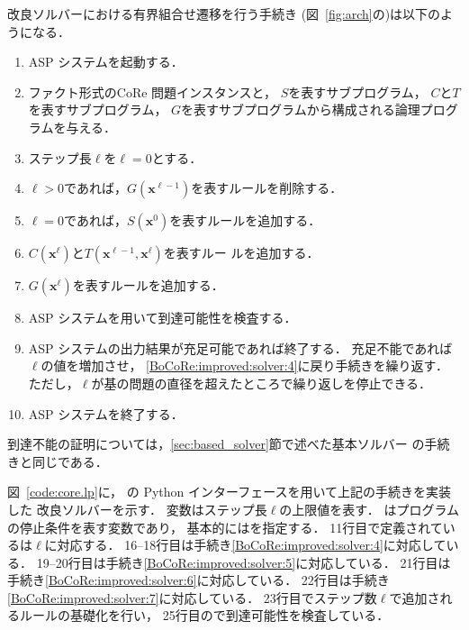 改良ソルバーにおける有界組合せ遷移を行う手続き
(図~\ref{fig:arch}の)は以下のようになる．
\begin{enumerate}
  \item ASP システムを起動する．
  \item ファクト形式のCoRe 問題インスタンスと，
    $S$を表すサブプログラム，
    $C$と$T$を表すサブプログラム，
    $G$を表すサブプログラムから構成される論理プログラムを与える．
  \item ステップ長$\ell$を$\ell=0$とする．
  \item \label{BoCoRe:improved:solver:4}
    $\ell > 0$であれば，$G(\bm{x}^{\ell -1})$を表すルールを削除する．
  \item \label{BoCoRe:improved:solver:5}
    $\ell=0$であれば，$S(\bm{x}^0)$を表すルールを追加する．
  \item \label{BoCoRe:improved:solver:6}
    $C(\bm{x}^{\ell})$と$T(\bm{x}^{\ell -1}, \bm{x}^{\ell})$を表すルー
    ルを追加する．
  \item \label{BoCoRe:improved:solver:7}
    $G(\bm{x}^{\ell})$を表すルールを追加する．
  \item ASP システムを用いて到達可能性を検査する．
  \item ASP システムの出力結果が充足可能であれば終了する．
        充足不能であれば$\ell$の値を増加させ，
        \ref{BoCoRe:improved:solver:4}に戻り手続きを繰り返す．
        ただし，$\ell$が基の問題の直径を超えたところで繰り返しを停止できる．
  \item ASP システムを終了する．
\end{enumerate}
到達不能の証明については，\ref{sec:based_solver}節で述べた基本ソルバー
の手続きと同じである．

図~\ref{code:core.lp}に，
{\clingo}の Python インターフェースを用いて上記の手続きを実装した
改良ソルバーを示す．
%
変数はステップ長$\ell$の上限値を表す．
はプログラムの停止条件を表す変数であり，
基本的にはを指定する．
11行目で定義されているは$\ell$に対応する．
16--18行目は手続き\ref{BoCoRe:improved:solver:4}に対応している．
19--20行目は手続き\ref{BoCoRe:improved:solver:5}に対応している．
21行目は手続き\ref{BoCoRe:improved:solver:6}に対応している．
22行目は手続き\ref{BoCoRe:improved:solver:7}に対応している．
23行目でステップ数$\ell$で追加されるルールの基礎化を行い，
25行目ので到達可能性を検査している．

